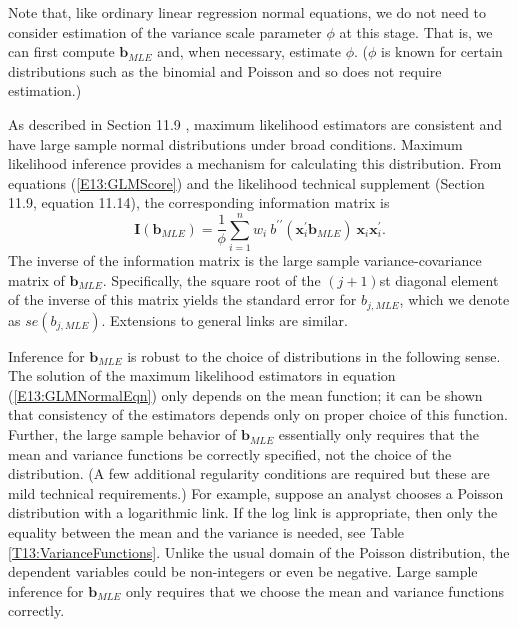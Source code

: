 Note that, like ordinary linear regression normal equations, we do
not need to consider estimation of the variance scale parameter
$\phi $ at this stage. That is, we can first compute
$\mathbf{b}_{MLE}$ and, when necessary, estimate $\phi $. ($\phi$ is
known for certain distributions such as the binomial and Poisson and
so does not require estimation.)

As described in Section 11.9%
, maximum likelihood estimators are consistent and have large sample
normal distributions under broad conditions. Maximum likelihood
inference provides a mechanism for calculating this distribution.
From equations (\ref{E13:GLMScore}) and the likelihood technical
supplement (Section 11.9, equation 11.14), the corresponding
information matrix is
\begin{equation} \label{E13:StdErrors}
\mathbf{I} \left( \mathbf{b}_{MLE} \right) =
\frac{1}{\phi}\sum_{i=1}^n w_i ~b^{\prime \prime }(\mathbf{x}_i
^{\mathbf{\prime }} \mathbf{b}_{MLE} ) ~ \mathbf{x}_i
\mathbf{x}_i^{\mathbf{\prime }} .
\end{equation}
The inverse of the information matrix is the large sample
variance-covariance matrix of $\mathbf{b}_{MLE}$. Specifically, the
square root of the $(j+1)$st diagonal element of the inverse of this
matrix yields the standard error for $b_{j,MLE}$, which we denote as
$se(b_{j,MLE})$. Extensions to general links are
similar.

Inference for $\mathbf{b}_{MLE}$ is robust to the choice of
distributions in the following sense. The solution of the maximum
likelihood estimators in equation (\ref{E13:GLMNormalEqn}) only
depends on the mean function; it can be shown that consistency of
the estimators depends only on proper choice of this function.
Further, the large sample behavior of $\mathbf{b}_{MLE}$ essentially
only requires that the mean and variance functions be correctly
specified, not the choice of the distribution. (A few additional
regularity conditions are required but these are mild technical
requirements.) For example, suppose an analyst chooses a Poisson
distribution with a logarithmic link. If the log link is
appropriate, then only the equality between the mean and the
variance is needed, see Table \ref{T13:VarianceFunctions}. Unlike
the usual domain of the Poisson distribution, the dependent
variables could be non-integers or even be negative. Large sample
inference for $\mathbf{b}_{MLE}$ only requires that we choose the
mean and variance functions correctly.

